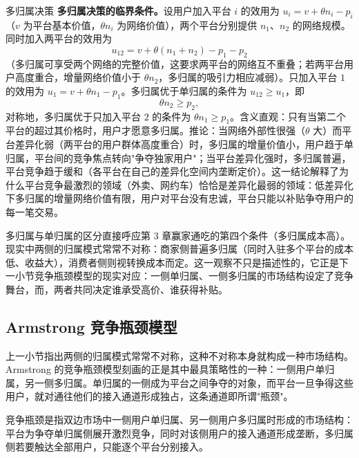 \begin{derivation}{多归属决策}{}
\textbf{多归属决策的临界条件。}设用户加入平台 $i$ 的效用为 $u_i = v + \theta n_i - p_i$（$v$ 为平台基本价值，$\theta n_i$ 为网络价值），两个平台分别提供 $n_1$、$n_2$ 的网络规模。同时加入两平台的效用为
\[
u_{12} = v + \theta(n_1+n_2) - p_1 - p_2
\]
（多归属可享受两个网络的完整价值，这要求两平台的网络互不重叠；若两平台用户高度重合，增量网络价值小于 $\theta n_2$，多归属的吸引力相应减弱）。只加入平台 $1$ 的效用为 $u_1 = v + \theta n_1 - p_1$。多归属优于单归属的条件为 $u_{12} \ge u_1$，即
\[
\theta n_2 \ge p_2,
\]
对称地，多归属优于只加入平台 $2$ 的条件为 $\theta n_1 \ge p_1$。含义直观：只有当第二个平台的超过其价格时，用户才愿意多归属。推论：当网络外部性很强（$\theta$ 大）而平台差异化弱（两平台的用户群体高度重合）时，多归属的增量价值小，用户趋于单归属，平台间的竞争焦点转向"争夺独家用户"；当平台差异化强时，多归属普遍，平台竞争趋于缓和（各平台在自己的差异化空间内垄断定价）。这一结论解释了为什么平台竞争最激烈的领域（外卖、网约车）恰恰是差异化最弱的领域：低差异化下多归属的增量网络价值有限，用户对平台没有忠诚，平台只能以补贴争夺用户的每一笔交易。
\end{derivation}

多归属与单归属的区分直接呼应第 3 章赢家通吃的第四个条件（多归属成本高）。现实中两侧的归属模式常常不对称：商家侧普遍多归属（同时入驻多个平台的成本低、收益大），消费者侧则视转换成本而定。这一观察不只是描述性的，它正是下一小节竞争瓶颈模型的现实对应：一侧单归属、一侧多归属的市场结构设定了竞争舞台，而，两者共同决定谁承受高价、谁获得补贴。

\subsection{Armstrong 竞争瓶颈模型}

上一小节指出两侧的归属模式常常不对称，这种不对称本身就构成一种市场结构。Armstrong 的竞争瓶颈模型刻画的正是其中最具策略性的一种：一侧用户单归属，另一侧多归属。单归属的一侧成为平台之间争夺的对象，而平台一旦争得这些用户，就对通往他们的接入通道形成独占，这条通道即所谓"瓶颈"。

\begin{definition}
竞争瓶颈是指双边市场中一侧用户单归属、另一侧用户多归属时形成的市场结构：平台为争夺单归属侧展开激烈竞争，同时对该侧用户的接入通道形成垄断，多归属侧若要触达全部用户，只能逐个平台分别接入。
\end{definition}

